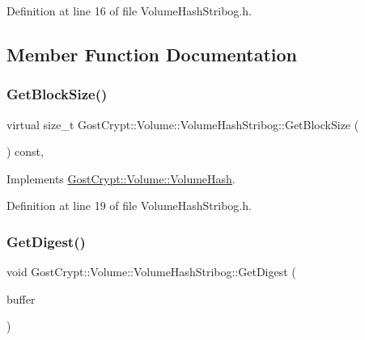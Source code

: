 Definition at line 16 of file Volume\+Hash\+Stribog.\+h.



\subsection{Member Function Documentation}
\mbox{\label{class_gost_crypt_1_1_volume_1_1_volume_hash_stribog_a27b7f587f66155c0edf88af3eb84686a}} 
\subsubsection{\texorpdfstring{Get\+Block\+Size()}{GetBlockSize()}}
{\footnotesize\ttfamily virtual size\+\_\+t Gost\+Crypt\+::\+Volume\+::\+Volume\+Hash\+Stribog\+::\+Get\+Block\+Size (\begin{DoxyParamCaption}{ }\end{DoxyParamCaption}) const\hspace{0.3cm}{\ttfamily [inline]}, {\ttfamily [virtual]}}



Implements \hyperlink{class_gost_crypt_1_1_volume_1_1_volume_hash_afa3e93a57c887289134901df48b9bced}{Gost\+Crypt\+::\+Volume\+::\+Volume\+Hash}.



Definition at line 19 of file Volume\+Hash\+Stribog.\+h.

\mbox{\label{class_gost_crypt_1_1_volume_1_1_volume_hash_stribog_a90a203ac607353bad84ebb6f6ad09cda}} 
\subsubsection{\texorpdfstring{Get\+Digest()}{GetDigest()}}
{\footnotesize\ttfamily void Gost\+Crypt\+::\+Volume\+::\+Volume\+Hash\+Stribog\+::\+Get\+Digest (\begin{DoxyParamCaption}\item[{\hyperlink{class_gost_crypt_1_1_buffer_ptr}{Buffer\+Ptr} \&}]{buffer }\end{DoxyParamCaption})\hspace{0.3cm}{\ttfamily [virtual]}}



